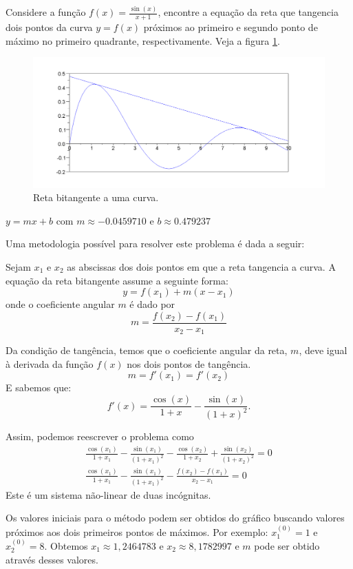 \begin{exer}\label{prob_bitang}Considere a função $f(x)=\frac{\sin(x)}{x+1}$, encontre a equação da reta que tangencia dois pontos da curva $y=f(x)$ próximos ao primeiro e segundo ponto de máximo no primeiro quadrante, respectivamente. Veja a figura \ref{pic:bitang}.
\end{exer}
\begin{figure}
        \centering
	    \includegraphics[width=\textwidth]{cap_nlinsis/pics/curva_Q23}
		\caption{Reta bitangente a uma curva.}
		\label{pic:bitang}
	\end{figure}

 \begin{resp}
  $y=mx+b$ com $m\approx - 0.0459710 $ e $b\approx 0.479237$
 
 Uma metodologia possível para resolver este problema é dada a seguir:

Sejam $x_1$ e $x_2$ as abscissas dos dois pontos em que a reta tangencia a curva. A equação da reta bitangente assume a seguinte forma:
$$y=f(x_1) + m(x-x_1) $$
onde o coeficiente angular $m$ é dado por
$$m=\frac{f(x_2)-f(x_1)}{x_2-x_1}$$

Da condição de tangência, temos que o coeficiente angular da reta, $m$, deve igual à derivada da função $f(x)$ nos dois pontos de tangência.
$$m=f'(x_1)=f'(x_2)$$
E sabemos que:
$$f'(x)=\frac{\cos(x)}{1+x}-\frac{\sin(x)}{(1+x)^2}.$$

Assim, podemos reescrever o problema como
\begin{eqnarray*}
\frac{\cos(x_1)}{1+x_1}-\frac{\sin(x_1)}{(1+x_1)^2}-\frac{\cos(x_2)}{1+x_2}+\frac{\sin(x_2)}{(1+x_2)^2}=0\\
\frac{\cos(x_1)}{1+x_1}-\frac{\sin(x_1)}{(1+x_1)^2}-\frac{f(x_2)-f(x_1)}{x_2-x_1}=0
\end{eqnarray*}
Este é um sistema não-linear de duas incógnitas.

Os valores iniciais para o método podem ser obtidos do gráfico buscando valores próximos aos dois primeiros pontos de máximos. Por exemplo: $x_1^{(0)}=1$ e $x_2^{(0)}=8$. Obtemos $x_1\approx 1,2464783$ e $x_2\approx 8,1782997$ e $m$ pode ser obtido através desses valores.


\end{resp}

